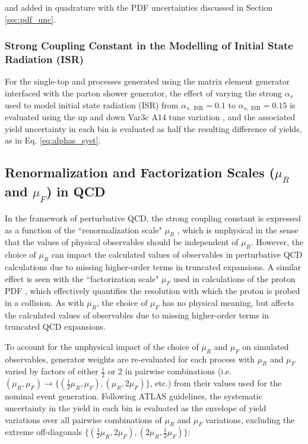 \noindent and added in quadrature with the PDF uncertainties discussed in Section \ref{sec:pdf_unc}.

\subsubsection{Strong Coupling Constant in the Modelling of Initial State Radiation (ISR)}

For the single-top and \ttbar processes generated using the \POWHEGBOX matrix element generator interfaced with the  parton shower generator, the effect of varying the strong \(\alpha_s\) used to model initial state radiation (ISR) from \(\alpha_{s,\text{ ISR}}=0.1\) to \(\alpha_{s, \text{ ISR}}=0.15\) is evaluated using the up and down Var3c A14 tune variation \cite{ATL-PHYS-PUB-2014-021}, and the associated yield uncertainty in each bin is evaluated as half the resulting difference of yields, as in Eq. \ref{eq:alphas_syst}. 

\subsection{Renormalization and Factorization Scales (\(\mu_R\) and \(\mu_F\)) in QCD}

In the framework of perturbative QCD, the strong coupling constant is expressed as a function of the ``renormalization scale" \(\mu_R\) \cite{pdg_2020}, which is unphysical in the sense that the values of physical observables should be independent of \(\mu_R\). However, the choice of \(\mu_R\) can impact the calculated values of observables in perturbative QCD calculations due to missing higher-order terms in truncated expansions. A similar effect is seen with the ``factorization scale" \(\mu_F\) used in calculations of the proton PDF \cite{maltoni2007choosing}, which effectively quantifies the resolution with which the proton is probed in a collision. As with \(\mu_R\), the choice of \(\mu_F\) has no physical meaning, but affects the calculated values of observables due to missing higher-order terms in truncated QCD expansions.

To account for the unphysical impact of the choice of \(\mu_R\) and \(\mu_F\) on simulated observables, generator weights are re-evaluated for each process with \(\mu_R\) and \(\mu_F\) varied by factors of either \(\frac{1}{2}\) or 2 in pairwise combinations (i.e. \((\mu_R, \mu_F)\rightarrow \{(\frac{1}{2}\mu_R, \mu_F), (\mu_R, 2\mu_F)\}\), etc.) from their values used for the nominal event generation. Following ATLAS guidelines, the systematic uncertainty in the yield in each bin is evaluated as the envelope of yield variations over all pairwise combinations of \(\mu_R\) and \(\mu_F\) variations, excluding the extreme off-diagonals \(\{(\frac{1}{2}\mu_R, 2\mu_F), (2\mu_R, \frac{1}{2}\mu_F)\}\): 

